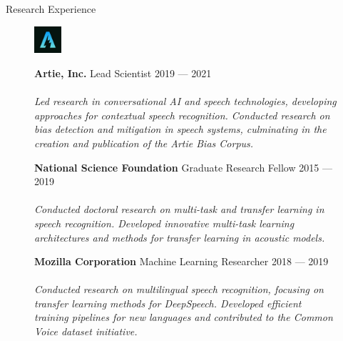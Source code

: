 \documentclass{cv} %
\begin{document}
\begin{rSection}{Research Experience}
  \begin{figure}[H]
    \begin{minipage}{0.2\textwidth}
      \centering
      \includegraphics[width=1cm]{imgs/artie-logo-small.jpeg}
    \end{minipage}
    \begin{minipage}{0.8\textwidth}
      {\bf Artie, Inc.} \hfill Lead Scientist \hspace{0.5cm} {2019 --- 2021} \\ \\
      \textit{Led research in conversational AI and speech technologies, developing approaches for contextual speech recognition. Conducted research on bias detection and mitigation in speech systems, culminating in the creation and publication of the Artie Bias Corpus.}
    \end{minipage}
  \end{figure}

  \begin{figure}[H]
    \begin{minipage}{0.2\textwidth}
      \centering
      
    \end{minipage}
    \begin{minipage}{0.8\textwidth}
      {\bf National Science Foundation} \hfill Graduate Research Fellow \hspace{0.5cm} {2015 --- 2019} \\ \\
      \textit{Conducted doctoral research on multi-task and transfer learning in speech recognition. Developed innovative multi-task learning architectures and methods for transfer learning in acoustic models.}
    \end{minipage}
  \end{figure}

  \begin{figure}[H]
    \begin{minipage}{0.2\textwidth}
      \centering
      
    \end{minipage}
    \begin{minipage}{0.8\textwidth}
      {\bf Mozilla Corporation} \hfill Machine Learning Researcher \hspace{0.5cm} {2018 --- 2019} \\ \\
      \textit{Conducted research on multilingual speech recognition, focusing on transfer learning methods for DeepSpeech. Developed efficient training pipelines for new languages and contributed to the Common Voice dataset initiative.}
    \end{minipage}
  \end{figure}


\end{rSection}
\end{document}
